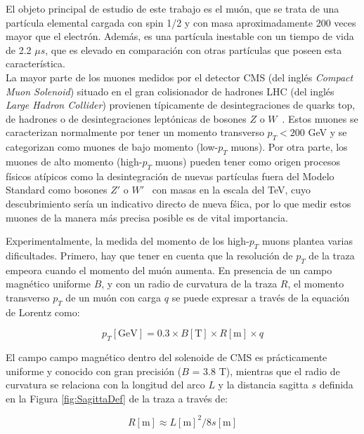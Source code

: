 
El objeto principal de estudio de este trabajo es el mu\'on, que se trata de una part\'icula elemental cargada con spin 1/2 y con masa aproximadamente 200 veces mayor que el electr\'on. Adem\'as, es una part\'icula inestable con un tiempo de vida de 2.2 $\mu s$, que es elevado en comparaci\'on con otras part\'iculas que poseen esta caracter\'istica. \\

La mayor parte de los muones medidos por el detector CMS (del ingl\'es \textit{Compact Muon Solenoid}) situado en el gran colisionador de hadrones LHC (del ingl\'es \textit{Large Hadron Collider}) provienen t\'ipicamente de desintegraciones de quarks top, de hadrones o de desintegraciones lept\'onicas de bosones $Z$ o $W$~\cite{PhysRevD.98.030001}. Estos muones se caracterizan normalmente por tener un momento transverso $p_{T} < 200$ GeV y se categorizan como muones de bajo momento (low-$p_{T}$ muons). Por otra parte, los muones de alto momento (high-$p_{T}$ muons) pueden tener como origen procesos f\'isicos at\'ipicos como la desintegraci\'on de nuevas part\'iculas fuera del Modelo Standard como bosones $Z'$ o $W'$~\cite{CMS-PAS-EXO-19-019,2017278} con masas en la escala del TeV, cuyo descubrimiento ser\'ia un indicativo directo de nueva f\'sica, por lo que medir estos muones de la manera m\'as precisa posible es de vital importancia.

Experimentalmente, la medida del momento de los high-$p_{T}$ muons plantea varias dificultades. Primero, hay que tener en cuenta que la resoluci\'on de $p_{T}$ de la traza empeora cuando el momento del mu\'on aumenta.
En presencia de un campo magn\'etico uniforme $B$, y con un radio de curvatura de la traza $R$, el momento transverso $p_{T}$ de un mu\'on con carga $q$ se puede expresar a trav\'es de la equaci\'on de Lorentz como:

\begin{equation}
  p_{T}[\text{GeV}] = 0.3 \times B[\text{T}] \times R[\text{m}] \times q
\label{eq:pTvsRadius}
\end{equation}

El campo campo magn\'etico dentro del solenoide de CMS es pr\'acticamente uniforme y conocido con gran precisi\'on ($B$ = 3.8 T), mientras que el radio de curvatura se relaciona con la longitud del arco $L$ y la distancia sagitta $s$ definida en la Figura \ref{fig:SagittaDef} de la traza a trav\'es de:

\begin{equation}
  R[\text{m}]\approx L[\text{m}]^{2}/8s[\text{m}]
\label{eq:RadiusvsSagitta}
\end{equation}


